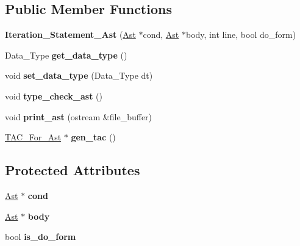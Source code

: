 \subsection*{Public Member Functions}
\begin{DoxyCompactItemize}
\item 
\mbox{\label{classIteration__Statement__Ast_a0c0d47119566eb3d9a19972f652d11c8}} 
{\bfseries Iteration\+\_\+\+Statement\+\_\+\+Ast} (\hyperlink{classAst}{Ast} $\ast$cond, \hyperlink{classAst}{Ast} $\ast$body, int line, bool do\+\_\+form)
\item 
\mbox{\label{classIteration__Statement__Ast_a96f25ec81c4786ad487c2b3994c98ad9}} 
Data\+\_\+\+Type {\bfseries get\+\_\+data\+\_\+type} ()
\item 
\mbox{\label{classIteration__Statement__Ast_a04b0649127b06decac624d4cad7e1b9e}} 
void {\bfseries set\+\_\+data\+\_\+type} (Data\+\_\+\+Type dt)
\item 
\mbox{\label{classIteration__Statement__Ast_a9388f7d8357c08c98e80317150b58f97}} 
void {\bfseries type\+\_\+check\+\_\+ast} ()
\item 
\mbox{\label{classIteration__Statement__Ast_a4aa24a9c9644c5d342280122bdac6bc4}} 
void {\bfseries print\+\_\+ast} (ostream \&file\+\_\+buffer)
\item 
\mbox{\label{classIteration__Statement__Ast_a650fdf53b0e5d7640ae750ed25498dbc}} 
\hyperlink{classTAC__For__Ast}{T\+A\+C\+\_\+\+For\+\_\+\+Ast} $\ast$ {\bfseries gen\+\_\+tac} ()
\end{DoxyCompactItemize}
\subsection*{Protected Attributes}
\begin{DoxyCompactItemize}
\item 
\mbox{\label{classIteration__Statement__Ast_ac95c353c38eb09bbbe786d236f7f5c00}} 
\hyperlink{classAst}{Ast} $\ast$ {\bfseries cond}
\item 
\mbox{\label{classIteration__Statement__Ast_a29ed27e158a5604713c8782de4dad0f8}} 
\hyperlink{classAst}{Ast} $\ast$ {\bfseries body}
\item 
\mbox{\label{classIteration__Statement__Ast_ac5245b3037441849c8bfc6f670d799b3}} 
bool {\bfseries is\+\_\+do\+\_\+form}
\end{DoxyCompactItemize}
